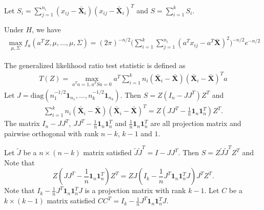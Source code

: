 \documentclass[review]{elsarticle}
\theoremstyle{plain}
\theoremstyle{definition}
\theoremstyle{remark}
\begin{document}
Let $S_i=\sum_{j=1}^{n_i}(x_{ij}-\bar{\mathbf{X}}_i)(x_{ij}-\bar{\mathbf{X}}_i)^T$ and $S=\sum_{i=1}^k S_i$.


Under $H$, we have
\begin{equation}
    \begin{aligned}
        \max_{\mu,\Sigma}f_a(a^T Z,\mu,\ldots,\mu,\Sigma)
        =
        (2\pi)^{-n/2}\big(\sum_{i=1}^k\sum_{j=1}^{n_i}(a^Tx_{ij}-a^T\bar{\mathbf{X}})^2\big)^{-n/2}e^{-{n}/{2}}
    \end{aligned}
\end{equation}

The generalized likelihood ratio test statistic is defined as
\begin{equation}
    \begin{aligned}
        T(Z)
        =
        \max_{a^T a=1, a^T S a=0} 
        a^T \sum_{i=1}^k n_i (\bar{\mathbf{X}}_i-\bar{\mathbf{X}})(\bar{\mathbf{X}}_i-\bar{\mathbf{X}})^T a
    \end{aligned}
\end{equation}
Let $J=\mathrm{diag}(n_1^{-1/2}\mathbf{1}_{n_1},\ldots,n_k^{-1/2}\mathbf{1}_{n_k})$.
Then $S=Z(I_n-JJ^T)Z^T$ and
\begin{equation}
    \begin{aligned}
        \sum_{i=1}^k n_i (\bar{\mathbf{X}}_i-\bar{\mathbf{X}})(\bar{\mathbf{X}}_i-\bar{\mathbf{X}})^T 
        =Z(JJ^T-\frac{1}{n}\mathbf{1}_n\mathbf{1}_n^T)Z^T.
    \end{aligned}
\end{equation}
The matrix $I_n-JJ^T$, $JJ^T-\frac{1}{n}\mathbf{1}_n\mathbf{1}_n^T$ and $\frac{1}{n}\mathbf{1}_n\mathbf{1}_n^T$ are all projection matrix and pairwise orthogonal with rank $n-k$, $k-1$ and $1$.

Let $\tilde{J}$ be a $n\times (n-k)$ matrix satisfied $\tilde{J}\tilde{J}^T =I-JJ^T$.
Then $S=Z\tilde{J}\tilde{J}^T Z^T$ and
 Note that 
$$
Z(JJ^T-\frac{1}{n}\mathbf{1}_n\mathbf{1}_n^T)Z^T
=ZJ(I_k-\frac{1}{n}J^T\mathbf{1}_n \mathbf{1}_n^T J)J^T Z^T.
$$
Note that $I_k-\frac{1}{n}J^T\mathbf{1}_n \mathbf{1}_n^T J$ is a projection matrix with rank $k-1$.
Let $C$ be a $k\times (k-1)$ matrix satisfied $CC^T=I_k-\frac{1}{n}J^T\mathbf{1}_n \mathbf{1}_n^T J$.
\end{document}
